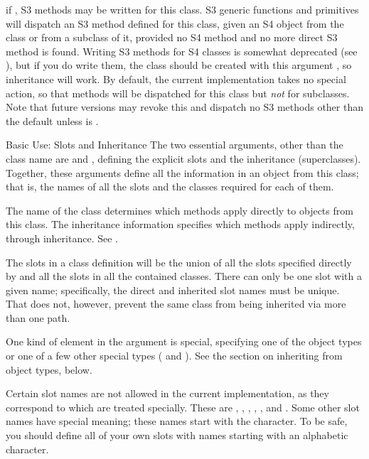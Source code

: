 \begin{Arguments}
\begin{ldescription}
\item[\code{S3methods}] if , S3 methods may be written for this
class.  S3 generic functions and primitives will
dispatch an S3 method defined for this class, given an S4 object
from the class or from a subclass of it, provided no S4
method and no more 
direct S3 method is found.  Writing S3 methods for S4 classes is
somewhat deprecated (see ), but if you do write
them, the class should be created with this argument
, so inheritance will work.  By default, the current
implementation takes no special action, so that methods will be
dispatched for this class but \emph{not} for subclasses.  Note
that future versions may revoke this and dispatch no S3 methods
other than the default unless  is .

\end{ldescription}
\end{Arguments}
%
\begin{Section}{Basic Use: Slots and Inheritance}
The two essential arguments, other than the class name are
 and , defining the explicit slots
and the inheritance (superclasses). Together, these arguments define
all the information in an object from this class; that is, the names
of all the slots and the classes required for each of them.

The name of the class determines
which methods apply directly to objects from this class.  The 
inheritance information specifies which methods apply indirectly,
through inheritance.  See .

The slots in a class definition will be the union of all the slots
specified directly by  and all the slots in all
the contained classes.
There can only be one slot with a given name; specifically, the
direct and inherited slot names must be unique.
That does not, however, prevent the same class from being inherited
via more than one path.

One kind of element in the  argument is special, specifying one of the \R{}
object types or one of a few other special \R{} types ( and
).
See the section on inheriting from object types, below.


Certain slot names are not allowed in the current implementation, as
they correspond to  which are treated
specially.  These are , , ,
, ,  and .
Some other slot names have special meaning; these names start with
the  character.  To be safe, you should define all of
your own slots with names starting with an alphabetic character.
\end{Section}
